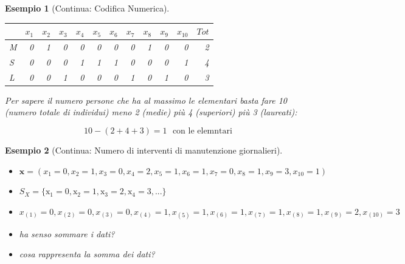 \documentclass[
  11pt,
]{book}
\providecommand{\tightlist}{%
  \setlength{\itemsep}{0pt}\setlength{\parskip}{0pt}}
\theoremstyle{mytheoremstyle}
\theoremstyle{mydefstyle}
\newtheorem{example}{{Esempio}}[section]
\begin{document}
\begin{example}[Continua: Codifica Numerica]
\begin{table}[H]
\centering
\begin{tabular}{lrrrrrrrrrrr}
\toprule
  & $x_1$ & $x_2$ & $x_3$ & $x_4$ & $x_5$ & $x_6$ & $x_7$ & $x_8$ & $x_9$ & $x_{10}$ & $Tot$\\
\midrule
M & 0 & 1 & 0 & 0 & 0 & 0 & 0 & 1 & 0 & 0 & 2\\
S & 0 & 0 & 0 & 1 & 1 & 1 & 0 & 0 & 0 & 1 & 4\\
L & 0 & 0 & 1 & 0 & 0 & 0 & 1 & 0 & 1 & 0 & 3\\
\bottomrule
\end{tabular}
\end{table}

Per sapere il numero persone che ha al massimo le elementari basta fare 10 (numero totale di individui)
meno 2 (medie) più 4 (superiori) più 3 (laureati):

\[
 10-(2+4+3)=1~~~\text{con le elemntari}
 \]
\end{example}

\begin{example}[Continua: Numero di interventi di manutenzione giornalieri]

\(\phantom{.}\)

\begin{itemize}
\tightlist
\item
  \(\mathbf{x}=(x_1 = 0, x_2 =1, x_3 =0, x_4=2,x_5=1,x_6=1,
  x_7=0,x_8=1,x_9=3,x_{10}=1)\)
\item
  \(S_X=\{\mathrm{x}_1 = 0,\mathrm{x}_2 = 1,\mathrm{x}_3=2,\mathrm{x}_4=3,...\}\)
\item
  \(x_{(1)}=0,x_{(2)}=0,x_{(3)}=0,x_{(4)}=1,x_{(5)}=1,x_{(6)}=1,x_{(7)}=1,x_{(8)}=1,x_{(9)}=2,
  x_{(10)}=3\)
\item
  ha senso sommare i dati?
\item
  cosa rappresenta la somma dei dati?
\end{itemize}

\end{example}
\end{document}
